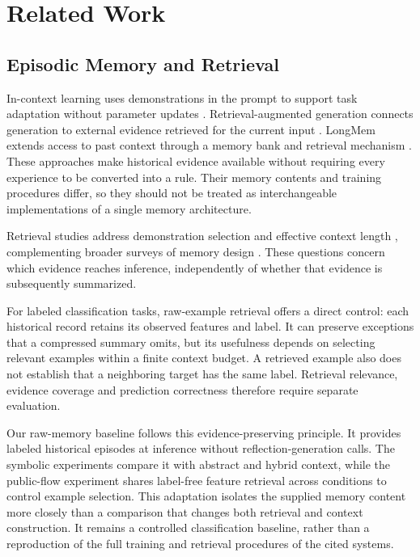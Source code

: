 \documentclass[onecolumn]{IEEEtran}
\numberwithin{equation}{section}
\theoremstyle{definition}
\theoremstyle{remark}
\begin{document}
\section{Related Work}
\subsection{Episodic Memory and Retrieval}
In-context learning uses demonstrations in the prompt to support task adaptation without parameter updates \cite{brown2020language}. Retrieval-augmented generation connects generation to external evidence retrieved for the current input \cite{lewis2020retrieval}. LongMem extends access to past context through a memory bank and retrieval mechanism \cite{wang2023longmem}. These approaches make historical evidence available without requiring every experience to be converted into a rule. Their memory contents and training procedures differ, so they should not be treated as interchangeable implementations of a single memory architecture.

Retrieval studies address demonstration selection \cite{zhang2022active,purohit2025sample} and effective context length \cite{an2024why}, complementing broader surveys of memory design \cite{wu2025from,zhang2024survey}. These questions concern which evidence reaches inference, independently of whether that evidence is subsequently summarized.

For labeled classification tasks, raw-example retrieval offers a direct control: each historical record retains its observed features and label. It can preserve exceptions that a compressed summary omits, but its usefulness depends on selecting relevant examples within a finite context budget. A retrieved example also does not establish that a neighboring target has the same label. Retrieval relevance, evidence coverage and prediction correctness therefore require separate evaluation.

Our raw-memory baseline follows this evidence-preserving principle. It provides labeled historical episodes at inference without reflection-generation calls. The symbolic experiments compare it with abstract and hybrid context, while the public-flow experiment shares label-free feature retrieval across conditions to control example selection. This adaptation isolates the supplied memory content more closely than a comparison that changes both retrieval and context construction. It remains a controlled classification baseline, rather than a reproduction of the full training and retrieval procedures of the cited systems.
\end{document}
